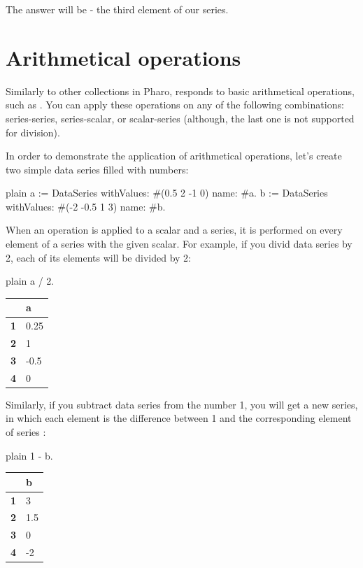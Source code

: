 \documentclass[10pt,twoside,english]{_support/latex/sbabook/sbabook}
\begin{document}
The answer will be  - the third element of our series.
\section{Arithmetical operations}
Similarly to other collections in Pharo,  responds to basic arithmetical operations, such as \textcode{+, -, *, /}. You can apply these operations on any of the following combinations: series-series, series-scalar, or scalar-series (although, the last one is not supported for division).

In order to demonstrate the application of arithmetical operations, let's create two simple data series filled with numbers:

\begin{displaycode}{plain}
a := DataSeries withValues: #(0.5 2 -1 0) name: #a.
b := DataSeries withValues: #(-2 -0.5 1 3) name: #b.
\end{displaycode}

When an operation is applied to a scalar and a series, it is performed on every element of a series with the given scalar. For example, if you divid data series  by 2, each of its elements will be divided by 2:

\begin{displaycode}{plain}
a / 2.
\end{displaycode}

\begin{tabular}{ll}
\toprule
 & \textbf{a} \\
\midrule
\textbf{1} & 0.25 \\
\textbf{2} & 1 \\
\textbf{3} & -0.5 \\
\textbf{4} & 0 \\
\bottomrule
\end{tabular}

Similarly, if you subtract data series  from the number 1, you will get a new series, in which each element is the difference between 1 and the corresponding element of series :

\begin{displaycode}{plain}
1 - b.
\end{displaycode}

\begin{tabular}{ll}
\toprule
 & \textbf{b} \\
\midrule
\textbf{1} & 3 \\
\textbf{2} & 1.5 \\
\textbf{3} & 0 \\
\textbf{4} & -2 \\
\bottomrule
\end{tabular}
\end{document}
